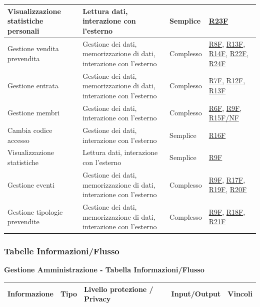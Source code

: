 \documentclass[a4paper]{article}
\begin{document}
\begin{center}
\begin{tabularx}{1\textwidth}{|X|X|X|X|}
        Visualizzazione statistiche personali & Lettura dati, interazione con l'esterno & Semplice &  \hyperlink{R23F}{R23F} \\
        \hline
        Gestione vendita prevendita & Gestione dei dati, memorizzazione di dati, interazione con l'esterno & Complesso & \hyperlink{R8F}{R8F}, \hyperlink{R13F}{R13F}, \hyperlink{R14F}{R14F}, \hyperlink{R22F}{R22F}, \hyperlink{R24F}{R24F} \\
        \hline
        Gestione entrata & Gestione dei dati, memorizzazione di dati, interazione con l'esterno & Complesso & \hyperlink{R7F}{R7F}, \hyperlink{R12F}{R12F}, \hyperlink{R13F}{R13F} \\
        \hline
        Gestione membri & Gestione dei dati, interazione con l'esterno & Complesso & \hyperlink{R6F}{R6F}, \hyperlink{R9F}{R9F}, \hyperlink{R15F/NF}{R15F/NF} \\
        \hline
        Cambia codice accesso & Gestione dei dati, interazione con l'esterno & Semplice & \hyperlink{R16F}{R16F}  \\
        \hline
        Visualizzazione statistiche & Lettura dati, interazione con l'esterno & Semplice & \hyperlink{R9F}{R9F}  \\
        \hline
        Gestione eventi & Gestione dei dati, memorizzazione di dati, interazione con l'esterno & Complesso & \hyperlink{R9F}{R9F}, \hyperlink{R17F}{R17F}, \hyperlink{R19F}{R19F}, \hyperlink{R20F}{R20F} \\
        \hline
        Gestione tipologie prevendite & Gestione dei dati, memorizzazione di dati, interazione con l'esterno & Complesso & \hyperlink{R9F}{R9F}, \hyperlink{R18F}{R18F}, \hyperlink{R21F}{R21F} \\
        \hline
    \end{tabularx}
\end{center}

\newpage

\subsubsection{Tabelle Informazioni/Flusso}

\textbf{Gestione Amministrazione - Tabella Informazioni/Flusso}

\begin{center}
    \begin{tabularx}{1\textwidth}{|X|X|X|X|X|}
        \hline
        \textbf{Informazione} &\textbf{Tipo} & \textbf{Livello protezione / Privacy} & \textbf{Input/Output} & \textbf{Vincoli}\\
        \hline
        \hline
    \end{tabularx}
\end{center}
\end{document}
